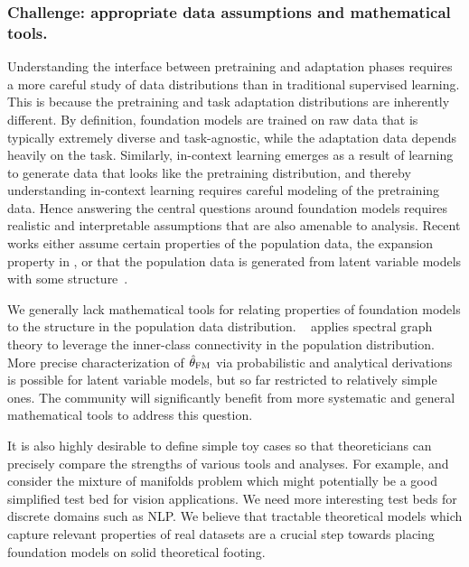 \subsubsection{Challenge: appropriate data assumptions and mathematical tools.}
 \label{sec:theory-tools}
Understanding the interface between pretraining and adaptation phases requires a more careful study of data distributions than in traditional supervised learning. This is because the pretraining and task adaptation distributions are inherently different. By definition, foundation models are trained on raw data that is typically extremely diverse and task-agnostic, while the adaptation data depends  heavily on the task. Similarly, in-context learning emerges as a result of learning to generate data that looks like the pretraining distribution, and thereby understanding in-context learning requires careful modeling of the pretraining data. Hence answering the central questions around foundation models requires realistic and interpretable assumptions that are also amenable to analysis. 
Recent works either assume certain properties of the population data, \eg the expansion property in \citet{haochen2021spectral, wei2020theoretical}, or that the population data is generated from latent variable models with some structure~\citep{SaMa20mat,wei2021pretrained,arora2015latent,lee2020predicting,zhang20ont,tosh2021contrastive}.


We generally lack mathematical tools for relating properties of foundation models to the structure in the population data distribution.  ~\citet{haochen2021spectral} applies spectral graph theory to leverage the inner-class connectivity in the population distribution. More precise characterization of $\hat{\theta}_{\textup{FM}}$ via probabilistic and analytical derivations is possible for latent variable models, but so far restricted to relatively simple ones. The community will significantly benefit from more systematic and general mathematical tools to address this question. 

It is also highly desirable to define simple toy cases so that theoreticians can precisely compare the strengths of various tools and analyses. For example, \citet{haochen2021spectral} and \citet{wei2020theoretical} consider the mixture of manifolds problem which might potentially be a good simplified test bed for vision applications. We need more interesting test beds for discrete domains such as NLP. 
We believe that tractable theoretical models which capture relevant properties of real datasets are a crucial step towards placing foundation models on solid theoretical footing.
